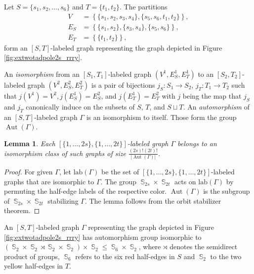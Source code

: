 \documentclass[english]{ourlematemasingle}
\numberwithin{theorem}{section}
\newtheorem{lemma}[theorem]{Lemma}
\theoremstyle{remark}
\newenvironment{example}
{\pushQED{\qed}\renewcommand{\qedsymbol}{$\diamond$}\examplex}
{\popQED\endexamplex}
\newcommand{\colS}{red}
\newcommand{\colT}{yellow}
\DeclareMathOperator{\SG}{{\mathbb S}}
\DeclareMathOperator{\Aut}{Aut}
\begin{document}
\begin{example}
    Let $S = \{s_1,s_2,\dots,s_6\}$ and $T = \{t_1,t_2\}$. The partitions 
    \begin{align*}
        V & = \left\{ \{s_1,s_2,s_3,s_4\}, \{s_5,s_6,t_1,t_2\} \right\}, \\
        E_S & = \left\{ \{s_1,s_2\}, \{s_3,s_4\}, \{s_5,s_6\} \right\}, \\
        E_T & = \left\{ \{t_1,t_2\} \right\},
    \end{align*}
    form an $[S,T]$-labeled graph representing the graph depicted in Figure \ref{fig:extwotadpole2s_rrry}.
\end{example}

An \emph{isomorphism} from an $[S_1,T_1]$-labeled graph $(V^{1},E_S^{1},E_T^{1})$ to an $[S_2,T_2]$-labeled graph $(V^{2},E_S^{2},E_T^{2})$
is a pair of bijections $j_S:S_1\rightarrow S_2$, $j_T:T_1\rightarrow T_2$ such that $j(V^{1}) = V^{2}, j(E_S^{1}) = E_S^{2}$, and $j(E_T^{1}) = E_T^{2}$
with $j$ being the map that $j_S$ and $j_T$ canonically induce on the subsets of $S$, $T$, and $S\sqcup T$.
An \emph{automorphism} of an $[S,T]$-lab\-eled graph $\Gamma$ is an isomorphism to itself. Those form the group $\Aut(\Gamma)$.
\begin{lemma}
\label{lmm:aut}
Each $[\{1,\ldots,2s\},\{1,\ldots,2t\}]$-labeled graph $\Gamma$ belongs to an isomorphism class of such graphs of size $\frac{(2s)!(2t)!}{|\Aut(\Gamma)|}$.
\end{lemma}
\begin{proof}
For given $\Gamma$, let $\mathrm{lab}(\Gamma)$ be the set of $[\{1,\ldots,2s\},\{1,\ldots,2t\}]$-labeled graphs that are isomorphic to $\Gamma$. The group $\SG_{2s}\times \SG_{2t}$ acts on $\mathrm{lab}(\Gamma)$ by permuting the half-edge labels of the respective color. $\Aut(\Gamma)$ is the subgroup of $\SG_{2s}\times \SG_{2t}$ stabilizing $\Gamma$. The lemma follows from the orbit stabilizer theorem.
\end{proof}

\begin{example}
    An $[S,T]$-labeled graph $\Gamma$ representing the graph depicted in Figure \ref{fig:extwotadpole2s_rrry} has automorphism group isomorphic to $\left(
    \SG_2 \times \SG_2 \rtimes \SG_2 \times \SG_2 \right) \times \SG_2 \leq \SG_6 \times \SG_2$, where $\rtimes$ denotes the semidirect product of groups, $\SG_6$ refers to the six {\colS} half-edges in $S$ and $\SG_2$ to the two {\colT} half-edges in $T$.
\end{example}
\end{document}
